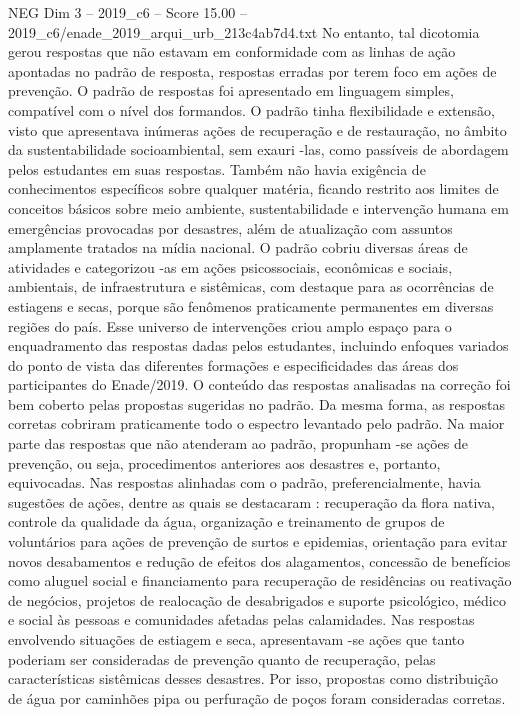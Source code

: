 \begin{textsample}{NEG Dim 3 – 2019\_c6 – Score 15.00 – 2019\_c6/enade\_2019\_arqui\_urb\_213c4ab7d4.txt}
No entanto, tal dicotomia gerou respostas que não estavam em conformidade com as linhas de ação apontadas no padrão de resposta, respostas erradas por terem foco em ações de prevenção.
O padrão de respostas foi apresentado em linguagem simples, compatível com o nível dos formandos.
O padrão tinha flexibilidade e extensão, visto que apresentava inúmeras ações de recuperação e de restauração, no âmbito da sustentabilidade socioambiental, sem exauri -las, como passíveis de abordagem pelos estudantes em suas respostas.
Também não havia exigência de conhecimentos específicos sobre qualquer matéria, ficando restrito aos limites de conceitos básicos sobre meio ambiente, sustentabilidade e intervenção humana em emergências provocadas por desastres, além de atualização com assuntos amplamente tratados na mídia nacional.
O padrão cobriu diversas áreas de atividades e categorizou -as em ações psicossociais, econômicas e sociais, ambientais, de infraestrutura e sistêmicas, com destaque para as ocorrências de estiagens e secas, porque são fenômenos praticamente permanentes em diversas regiões do país.
Esse universo de intervenções criou amplo espaço para o enquadramento das respostas dadas pelos estudantes, incluindo enfoques variados do ponto de vista das diferentes formações e especificidades das áreas dos participantes do Enade/2019.
O conteúdo das respostas analisadas na correção foi bem coberto pelas propostas sugeridas no padrão.
Da mesma forma, as respostas corretas cobriram praticamente todo o espectro levantado pelo padrão.
Na maior parte das respostas que não atenderam ao padrão, propunham -se ações de prevenção, ou seja, procedimentos anteriores aos desastres e, portanto, equivocadas.
Nas respostas alinhadas com o padrão, preferencialmente, havia sugestões de ações, dentre as quais se destacaram : recuperação da flora nativa, controle da qualidade da água, organização e treinamento de grupos de voluntários para ações de prevenção de surtos e epidemias, orientação para evitar novos desabamentos e redução de efeitos dos alagamentos, concessão de benefícios como aluguel social e financiamento para recuperação de residências ou reativação de negócios, projetos de realocação de desabrigados e suporte psicológico, médico e social às pessoas e comunidades afetadas pelas calamidades.
Nas respostas envolvendo situações de estiagem e seca, apresentavam -se ações que tanto poderiam ser consideradas de prevenção quanto de recuperação, pelas características sistêmicas desses desastres.
Por isso, propostas como distribuição de água por caminhões pipa ou perfuração de poços foram consideradas corretas.

\end{textsample}
